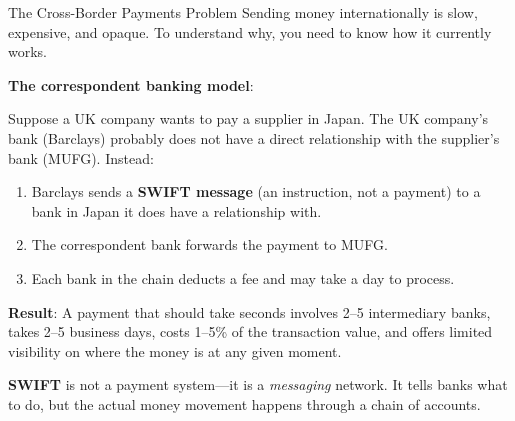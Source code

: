 \documentclass[10pt]{beamer}
\newcommand{\highlight}[1]{\textcolor{AccentOrange}{\textbf{#1}}}
\begin{document}
\begin{frame}{The Cross-Border Payments Problem}
  Sending money internationally is slow, expensive, and opaque. To understand why, you need to know how it currently works.
  
  \vspace{0.5em}
  \textbf{The \highlight{correspondent banking} model}:
  
  \vspace{0.5em}
  Suppose a UK company wants to pay a supplier in Japan. The UK company's bank (Barclays) probably does not have a direct relationship with the supplier's bank (MUFG). Instead:
  \begin{enumerate}
    \item Barclays sends a \textbf{SWIFT message} (an instruction, not a payment) to a bank in Japan it does have a relationship with.
    \item The correspondent bank forwards the payment to MUFG.
    \item Each bank in the chain deducts a fee and may take a day to process.
  \end{enumerate}
  
  \vspace{0.5em}
  \textbf{Result}: A payment that should take seconds involves 2--5 intermediary banks, takes 2--5 business days, costs 1--5\% of the transaction value, and offers limited visibility on where the money is at any given moment.
  
  \vspace{0.5em}
  \highlight{SWIFT} is not a payment system---it is a \textit{messaging} network. It tells banks what to do, but the actual money movement happens through a chain of accounts.
\end{frame}
\end{document}
